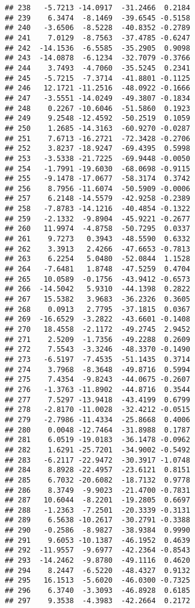 \documentclass[
]{article}
\begin{document}
\begin{verbatim}
## 238   -5.7213 -14.0917  -31.2466  0.2184
## 239    6.3474  -8.1469  -39.6545 -0.5158
## 240   -3.6506  -8.5228  -40.8352 -0.2789
## 241    7.0129  -8.7563  -37.4785 -0.6247
## 242  -14.1536  -6.5585  -35.2905  0.9098
## 243  -14.0878  -6.1234  -32.7079 -0.3766
## 244    3.7493  -4.7060  -35.5245  0.2341
## 245   -5.7215  -7.3714  -41.8801 -0.1125
## 246   12.1721 -11.2516  -48.0922 -0.1666
## 247   -3.5551 -14.0249  -49.3807 -0.1834
## 248    0.2267 -10.6046  -51.5860  0.1923
## 249    9.2548 -12.4592  -50.2519  0.1059
## 250    1.2685 -14.3163  -60.9270 -0.0287
## 251    7.6713 -16.2721  -72.3428 -0.2706
## 252    3.8237 -18.9247  -69.4395  0.5998
## 253   -3.5338 -21.7225  -69.9448 -0.0050
## 254   -1.7991 -19.6030  -68.0698 -0.9115
## 255   -9.1478 -17.0677  -58.3174  0.3742
## 256    8.7956 -11.6074  -50.5909 -0.0006
## 257    6.2148 -14.5579  -42.9258 -0.2389
## 258   -7.8783 -14.1216  -40.4854 -0.1322
## 259   -2.1332  -9.8904  -45.9221 -0.2677
## 260   11.9974  -4.8758  -50.7295  0.0337
## 261    9.7273   0.3943  -48.5590  0.6332
## 262    3.3913   2.4266  -47.6653 -0.7813
## 263    6.2254   5.0480  -52.0844  1.1528
## 264   -7.6481   1.8748  -47.5259  0.4704
## 265   10.0589  -0.1756  -43.9412 -0.6573
## 266  -14.5042   5.9310  -44.1398  0.2822
## 267   15.5382   3.9683  -36.2326  0.3605
## 268    0.0913   2.7795  -37.1815  0.0367
## 269  -16.6529  -3.2822  -43.6601 -0.1408
## 270   18.4558  -2.1172  -49.2745  2.9452
## 271    2.5209  -1.7356  -49.2288  0.2609
## 272    7.5543  -3.3246  -48.3370 -0.1490
## 273   -6.5197  -7.4535  -51.1435  0.3714
## 274    3.7968  -8.3648  -49.8716  0.5994
## 275    7.4354  -9.8243  -44.0675 -0.2607
## 276   -1.3763 -11.8902  -44.8716  0.3544
## 277    7.5297 -13.9418  -43.4199  0.6799
## 278   -2.8170 -11.0028  -32.4212 -0.0515
## 279   -2.7986 -11.4334  -25.8668  0.4006
## 280    0.0048 -12.7464  -31.8988  0.1787
## 281    6.0519 -19.0183  -36.1478 -0.0962
## 282    1.6291 -25.7201  -34.9002 -0.5492
## 283   -6.2117 -22.9472  -30.3917 -1.0748
## 284    8.8928 -22.4957  -23.6121  0.8151
## 285    6.7032 -20.6082  -18.7132  0.9778
## 286    8.3749  -9.9023  -21.4700 -0.7831
## 287   10.6044  -8.2201  -19.2805  0.6697
## 288   -1.2363  -7.2501  -20.3339 -0.3131
## 289    6.5638 -10.2617  -30.2791 -0.3388
## 290   -0.2586  -8.9827  -38.9384  0.9990
## 291    9.6053 -10.1387  -46.1952  0.4639
## 292  -11.9557  -9.6977  -42.2364 -0.8543
## 293  -14.2462  -9.8780  -49.1116  0.4620
## 294    8.2447  -6.5220  -48.4327  0.9132
## 295   16.1513  -5.6020  -46.0300 -0.7325
## 296    6.3740  -3.3093  -46.8928  0.6185
## 297    9.3538  -4.3983  -42.2664  0.2172

\end{verbatim}
\end{document}
